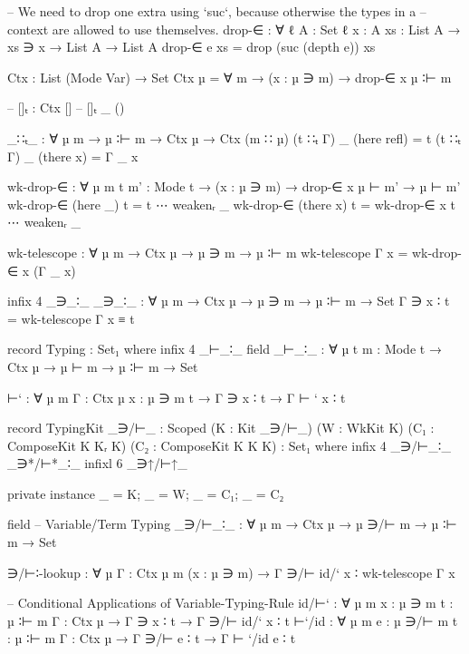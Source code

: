 \begin{code}
        -- We need to drop one extra using `suc`, because otherwise the types in a
        -- context are allowed to use themselves.
        drop-∈ : ∀ {ℓ} {A : Set ℓ} {x : A} {xs : List A} → xs ∋ x → List A → List A
        drop-∈ e xs = drop (suc (depth e)) xs

        Ctx : List (Mode Var) → Set
        Ctx µ = ∀ m → (x : µ ∋ m) → drop-∈ x µ ∶⊢ m

        -- []ₜ : Ctx []
        -- []ₜ _ ()

        _∷ₜ_ : ∀ {µ m} → µ ∶⊢ m → Ctx µ → Ctx (m ∷ µ)
        (t ∷ₜ Γ) _ (here refl) = t
        (t ∷ₜ Γ) _ (there x)   = Γ _ x

        wk-drop-∈ : ∀ {µ m t} {m' : Mode t} → (x : µ ∋ m) → drop-∈ x µ ⊢ m' → µ ⊢ m'
        wk-drop-∈ (here _)  t = t ⋯ weakenᵣ _
        wk-drop-∈ (there x) t = wk-drop-∈ x t ⋯ weakenᵣ _

        wk-telescope : ∀ {µ m} → Ctx µ → µ ∋ m → µ ∶⊢ m
        wk-telescope Γ x = wk-drop-∈ x (Γ _ x)

        infix   4  _∋_∶_
        _∋_∶_ : ∀ {µ m} → Ctx µ → µ ∋ m → µ ∶⊢ m → Set
        Γ ∋ x ∶ t = wk-telescope Γ x ≡ t

        record Typing : Set₁ where
          infix   4  _⊢_∶_
          field
            _⊢_∶_ : ∀ {µ t} {m : Mode t} → Ctx µ → µ ⊢ m → µ ∶⊢ m → Set

            ⊢` : ∀ {µ m} {Γ : Ctx µ} {x : µ ∋ m} {t} →
                Γ ∋ x ∶ t → Γ ⊢ ` x ∶ t

          record TypingKit {_∋/⊢_ : Scoped} (K : Kit _∋/⊢_) (W : WkKit K) (C₁ : ComposeKit K Kᵣ K) (C₂ : ComposeKit K K K) : Set₁ where
            infix   4  _∋/⊢_∶_  _∋*/⊢*_∶_
            infixl  6  _∋↑/⊢↑_

            private instance _ = K; _ = W; _ = C₁; _ = C₂

            field
              -- Variable/Term Typing
              _∋/⊢_∶_ : ∀ {µ m} → Ctx µ → µ ∋/⊢ m → µ ∶⊢ m → Set

              ∋/⊢∶-lookup : ∀ {µ} {Γ : Ctx µ} {m} (x : µ ∋ m)
                            → Γ ∋/⊢ id/` x ∶ wk-telescope Γ x

              -- Conditional Applications of Variable-Typing-Rule
              id/⊢` : ∀ {µ m} {x : µ ∋ m} {t : µ ∶⊢ m} {Γ : Ctx µ}
                      → Γ ∋ x ∶ t
                      →  Γ ∋/⊢ id/` x ∶ t
              ⊢`/id : ∀ {µ m} {e : µ ∋/⊢ m} {t : µ ∶⊢ m} {Γ : Ctx µ}
                      → Γ ∋/⊢ e ∶ t
                      → Γ ⊢ `/id e ∶ t


\end{code}
